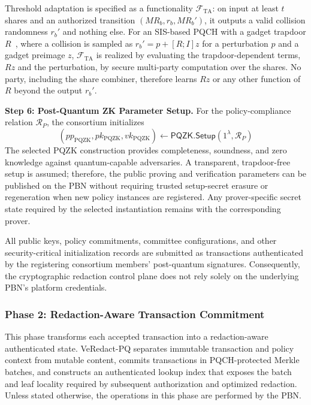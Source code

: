\documentclass[lettersize,journal]{IEEEtran}
\begin{document}
Threshold adaptation is specified as a functionality
$\mathcal{F}_{\mathrm{TA}}$: on input at least $t$ shares and an
authorized transition $(MR_b,r_b,MR_b')$, it outputs a valid collision
randomness $r_b'$ and nothing else. For an SIS-based PQCH with a gadget
trapdoor $R$~\cite{ref10,ref17}, where a collision is sampled as
$r_b'=p+[R;I]z$ for a perturbation $p$ and a gadget preimage $z$,
$\mathcal{F}_{\mathrm{TA}}$ is realized by evaluating the
trapdoor-dependent terms, $Rz$ and the perturbation, by secure
multi-party computation over the shares. No party, including the share
combiner, therefore learns $Rz$ or any other function of $R$ beyond the
output $r_b'$.

\textbf{Step 6: Post-Quantum ZK Parameter Setup.}
For the policy-compliance relation $\mathcal{R}_P$, the consortium
initializes
\begin{equation}
(pp_{\mathrm{PQZK}},pk_{\mathrm{PQZK}},vk_{\mathrm{PQZK}})
\leftarrow
\mathsf{PQZK.Setup}(1^\lambda,\mathcal{R}_P)
\end{equation}
The selected PQZK construction provides completeness, soundness, and
zero knowledge against quantum-capable adversaries. A transparent,
trapdoor-free setup is assumed; therefore, the public proving and
verification parameters can be published on the PBN without requiring
trusted setup-secret erasure or regeneration when new policy instances
are registered. Any prover-specific secret state required by the
selected instantiation remains with the corresponding prover.

All public keys, policy commitments, committee configurations, and
other security-critical initialization records are submitted as
transactions authenticated by the registering consortium members'
post-quantum signatures. Consequently, the cryptographic redaction
control plane does not rely solely on the underlying PBN's platform
credentials.
    
    
    
   \subsubsection*{\textbf{Phase 2: Redaction-Aware Transaction Commitment}}

This phase transforms each accepted transaction into a redaction-aware
authenticated state. VeRedact-PQ separates immutable transaction and
policy context from mutable content, commits transactions in
PQCH-protected Merkle batches, and constructs an authenticated lookup
index that exposes the batch and leaf locality required by subsequent
authorization and optimized redaction. Unless stated otherwise, the
operations in this phase are performed by the PBN.
\end{document}
